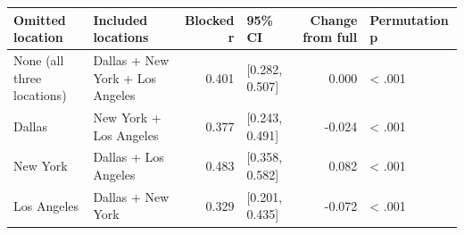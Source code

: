 \begin{tabular}{llrlrl}
\toprule
Omitted location & Included locations & Blocked r & 95\% CI & Change from full & Permutation p \\
\midrule
None (all three locations) & Dallas + New York + Los Angeles & 0.401 & [0.282, 0.507] & 0.000 & < .001 \\
Dallas & New York + Los Angeles & 0.377 & [0.243, 0.491] & -0.024 & < .001 \\
New York & Dallas + Los Angeles & 0.483 & [0.358, 0.582] & 0.082 & < .001 \\
Los Angeles & Dallas + New York & 0.329 & [0.201, 0.435] & -0.072 & < .001 \\
\bottomrule
\end{tabular}
